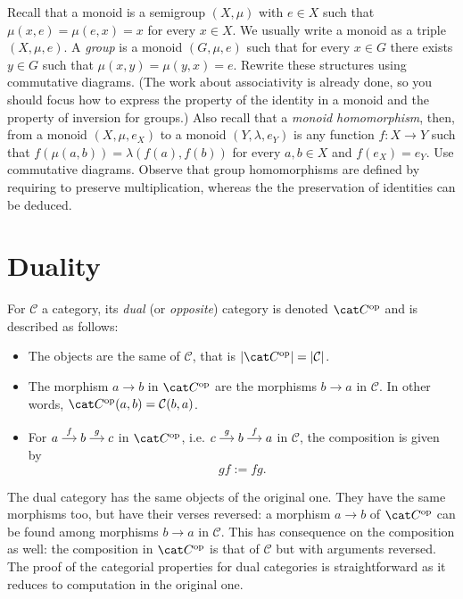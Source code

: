 \begin{exercise}
  Recall that a monoid is a semigroup \((X, \mu)\) with \(e \in X\)
  such that \(\mu(x, e) = \mu(e, x) = x\) for every \(x \in X\). We
  usually write a monoid as a triple \((X, \mu, e)\). A {\em group} is
  a monoid \((G, \mu, e)\) such that for every \(x \in G\) there
  exists \(y \in G\) such that \(\mu(x, y) = \mu(y, x) = e\). Rewrite
  these structures using commutative diagrams. (The work about
  associativity is already done, so you should focus how to express
  the property of the identity in a monoid and the property of
  inversion for groups.)  Also recall that a {\em monoid
    homomorphism}, then, from a monoid \((X, \mu, e_X)\) to a monoid
  \((Y, \lambda, e_Y)\) is any function \(f : X \to Y\) such that
  \(f(\mu(a, b)) = \lambda (f(a), f(b))\) for every \(a, b \in X\) and
  \(f(e_X) = e_Y\). Use commutative diagrams. Observe that group
  homomorphisms are defined by requiring to preserve multiplication,
  whereas the the preservation of identities can be deduced.
\end{exercise}



\section{Duality}

\begin{construction}
For \(\mathcal{C}\) a category, its {\em dual} (or {\em opposite}) category
is denoted \(\opcat C\) and is described as follows:
\begin{itemize}
\item The objects are the same of \(\mathcal{C}\), that is
  \(\obj{\opcat C} = \obj{\mathcal{C}}\).
\item The morphism \(a \to b\) in \(\opcat C\) are the morphisms
  \(b \to a\) in \(\mathcal{C}\). In other words,
  \(\opcat C (a, b) = \mathcal{C}(b, a)\).
\item For
  \(\begin{tikzcd}[column sep=small, cramped] a \ar["{f}", r] & b
    \ar["{g}", r] & c \end{tikzcd}\) in \(\opcat C\), i.e.
  \(\begin{tikzcd}[column sep=small, cramped] c \ar["{g}", r] & b
    \ar["{f}", r] & a \end{tikzcd}\) in \(\mathcal{C}\), the composition is
  given by
  \[
    gf := fg .
  \]
\end{itemize}
The dual category has the same objects of the original one. They have
the same morphisms too, but have their verses reversed: a morphism
\(a \to b\) of \(\opcat C\) can be found among morphisms \(b \to a\) in
\(\mathcal{C}\). This has consequence on the composition as well: the
composition in \(\opcat C\) is that of \(\mathcal{C}\) but with arguments
reversed. The proof of the categorial properties for dual categories is
straightforward as it reduces to computation in the original one.
\end{construction}

